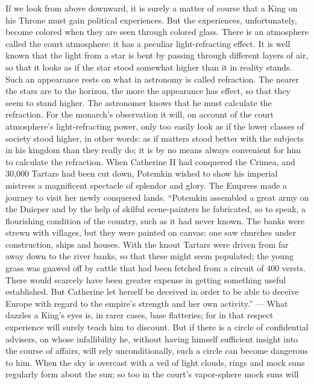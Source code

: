 \documentclass[12pt,a4paper,openany]{book}
\newcommand{\opage}[1]{\marginnote{\footnotesize\textit{[#1]}}}
\begin{document}
If we look from above downward, it is surely a matter of course
that a King on his Throne must gain political experiences.
But the experiences, unfortunately, become colored
when they are seen through colored glass. There is an atmosphere
called the court atmosphere: it has a
peculiar light-refracting effect. It is well known that the light
from a star is bent by passing through different
layers of air, so that it looks as if the star stood
somewhat higher than it in reality stands. Such an
appearance rests on what in astronomy
is called refraction. The nearer the stars are to the
horizon, the more the appearance has effect, so that they
seem to stand higher. The astronomer knows that he must
calculate the refraction. For the monarch's observation it will,
on account of the court atmosphere's light-refracting power,
only too easily look as if the lower classes of society stood
higher, in other words: as if matters stood
better with the subjects in his kingdom than they
really do; it is by no means always convenient for him to
calculate the refraction. When Catherine II had conquered
the Crimea, and 30,000 Tartars had been cut down, Potemkin
wished to show his imperial mistress a magnificent
spectacle of splendor and glory. The Empress made a
journey to visit her newly conquered lands. ``Potemkin
assembled a great army on the Dnieper and by the help of skilful
scene-painters he fabricated, so to speak, a
flourishing condition of the country, such as it had never
known. The banks were strewn with villages,
but they were painted on canvas: one saw churches
\setcounter{footnote}{0}%
\opage{44}under construction, ships and houses. With the knout
Tartars were driven from far away down to the river banks, so that
these might seem populated; the young grass was
gnawed off by cattle that had been fetched from a circuit of 400 versts.
There would scarcely have been greater expense in
getting something useful established. But Catherine let herself be
deceived in order to be able to deceive Europe with regard to the empire's
strength and her own activity.'' --- What
dazzles a King's eyes is, in rarer cases,
base flatteries; for in that respect experience will surely
teach him to discount. But if there is a circle of
confidential advisers, on whose infallibility he, without
having himself sufficient insight into the course of affairs,
will rely unconditionally, such a circle can become dangerous to him.
When the sky is overcast with a veil of light clouds,
rings and mock suns regularly form about the sun;
so too in the court's vapor-sphere mock suns will
\end{document}
